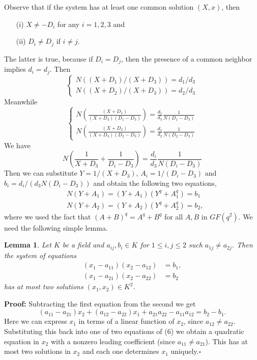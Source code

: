 \documentclass[12pt]{article}
\newtheorem{lemma}{Lemma}
\begin{document}
		Observe that if the system has at least one common solution $ (X, x) $, then
		\begin{itemize}
			\item[(i)] $ X \neq -D_i $ for any $ i = 1, 2, 3 $ and
			\item[(ii)] $ D_i \neq D_j $ if $ i \neq j $.
		\end{itemize}
		The latter is true, because if $ D_i = D_j $, then the presence of a common neighbor implies $ d_i = d_j $.
	Then
			\[
		\begin{cases}
			N((X + D_1)/(X+D_3)) = d_1/d_3 \\
			N((X + D_2)/(X+D_3)) = d_2/d_3 
		\end{cases} 
		\]
		Meanwhile
			\[
		\begin{cases}
			N(\frac{(X + D_1)}{(X+D_3)(D_1-D_3)}) = \frac{d_1}{d_3}\frac{1}{N(D_1-D_3)}\\
			N(\frac{(X + D_2)}{(X+D_3)(D_2-D_3)}) = \frac{d_1}{d_2}\frac{1}{N(D_2-D_3)}
		\end{cases} 
		\]
		We have
		\[
		N\left(\frac{1}{X+D_3}+\frac{1}{D_i-D_3}\right)=\frac{d_i}{d_3}\frac{1}{N(D_i-D_3)}
		\]
 Then we can substitute $ Y = 1/(X + D_3) $, $ A_i = 1/(D_i - D_3) $ and $ b_i = d_i/(d_3N(D_i - D_3)) $ and obtain the following two equations,
		\begin{align*}\tag{5}
			&N(Y + A_1) = (Y + A_1)(Y^q + A_1^q) = b_1 	\\		
			&N(Y + A_2) = (Y + A_2)(Y^q + A_2^q) = b_2,
		\end{align*}
		where we used the fact that $ (A + B)^q = A^q + B^q $ for all $ A, B $ in $ GF(q^2) $. We need the following simple lemma.
		
		\begin{lemma}
			Let $ K $ be a field and $ a_{ij}, b_i \in K $ for $ 1 \leqslant i, j \leqslant 2 $ such $ a_{1j} \neq a_{2j} $. Then the system of equations
			\begin{align*}
				(x_1 - a_{11})(x_2 - a_{12}) &= b_1, \\
				(x_1 - a_{21})(x_2 - a_{22}) &= b_2\tag{6}
			\end{align*}
			has at most two solutions $ (x_1, x_2) \in K^2 $.
		\end{lemma}
		{\bf Proof:}
			Subtracting the first equation from the second we get
			\[
			(a_{11} - a_{21})x_2 + (a_{12} - a_{22})x_1 + a_{21}a_{22} - a_{11}a_{12} = b_2 - b_1.
			\]
			Here we can express $ x_1 $ in terms of a linear function of $ x_2 $, since $ a_{12} \neq a_{22} $. Substituting this back into one of two equations of (6) we obtain a quadratic equation in $ x_2 $ with a nonzero leading coefficient (since $ a_{11} \neq a_{21} $). This has at most two solutions in $ x_2 $ and each one determines $ x_1 $ uniquely.\hfill$\square$
			
\end{document}
